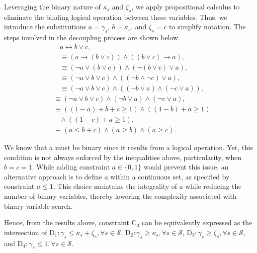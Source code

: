 \documentclass[10pt,journal,compsoc]{IEEEtran}
\theoremstyle{myremark}
\theoremstyle{myexample}
\begin{document}
\begin{appendices}
Leveraging the binary nature of $ \kappa_s $ and $ \zeta_s $, we apply propositional calculus to eliminate the binding logical operation between these variables. Thus, we introduce the substitutions $ a = \gamma_s $, $ b = \kappa_s $, and $ \zeta_s = c $ to simplify notation. The steps involved in the decoupling process are shown below.
\begin{align*} 
	& a \leftrightarrow b \lor c, 
	\\
	& \equiv \left( a \rightarrow \left( b \lor c \right) \right) \wedge \left( \left( b \lor c \right) \rightarrow a \right), 
	\\
	& \equiv \left( \neg a \lor \left( b \lor c \right) \right) \wedge \left( \neg \left( b \lor c \right) \lor a \right), 
	\\
	& \equiv \left( \neg a \lor b \lor c \right) \wedge \left( \left( \neg b \wedge \neg c \right) \lor a \right),
	\\
	& \equiv \left( \neg a \lor b \lor c \right) \wedge \left( \left( \neg b \lor a \right) \wedge \left( \neg c \lor a \right) \right), 
\end{align*} 
\begin{align*} 
	& \equiv \left( \neg a \lor b \lor c \right) \wedge \left( \neg b \lor a \right) \wedge \left( \neg c \lor a \right), 
	\\
	& \equiv \left( \left( 1 - a \right) + b + c \geq 1 \right) \wedge \left( \left( 1 - b \right) + a \geq 1 \right)
	\\
	& ~~~~ \wedge \left( \left( 1 - c \right) + a \geq 1 \right),
	\\
	& \equiv \left( a \leq b + c \right) \wedge \left( a \geq b \right) \wedge \left( a \geq c \right).
\end{align*} 



We know that $ a $ must be binary since it results from a logical operation. Yet, this condition is not always enforced by the inequalities above, particularity, when $ b = c = 1 $. While adding constraint $ a \in \{0,1\} $ would prevent this issue, an alternative approach is to define $ a $ within a continuous set, as specified by constraint $ a \leq 1 $. This choice maintains the integrality of $ a $ while reducing the number of binary variables, thereby lowering the complexity associated with binary variable search.

Hence, from the results above, constraint $ \mathrm{C}_{3} $ can be equivalently expressed as the intersection of $ \mathrm{D}_{1}: \gamma_s \leq \kappa_s + \zeta_s, \forall s \in \mathcal{S} $, $ \mathrm{D}_{2}: \gamma_s \geq \kappa_s, \forall s \in \mathcal{S} $, $ \mathrm{D}_{3}: \gamma_s \geq \zeta_s, \forall s \in \mathcal{S} $, and $ \mathrm{D}_{4}: \gamma_s \leq 1, \forall s \in \mathcal{S} $.



\end{appendices}
\end{document}
